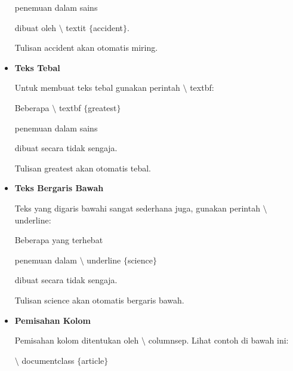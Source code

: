 \begin{itemize}
\hspace*{0.5in}penemuan dalam sains\par

\hspace*{0.5in}dibuat oleh $\setminus$ textit $ \{ $accident$ \} $.\par
\vspace{\baselineskip}
Tulisan accident akan otomatis miring.\par
\vspace{\baselineskip}
\vspace{10pt}
	\item {\fontsize{14pt}{14pt}\selectfont \textbf{Teks Tebal}}\par
Untuk membuat teks tebal gunakan perintah $\setminus$ textbf:\par
\hspace*{0.5in}Beberapa $\setminus$ textbf $ \{ $greatest$ \} $\par

\hspace*{0.5in}penemuan dalam sains\par

\hspace*{0.5in}dibuat secara tidak sengaja.\par
Tulisan greatest akan otomatis tebal.\par

\vspace{10pt}
	\item {\fontsize{14pt}{14pt}\selectfont \textbf{Teks Bergaris Bawah}}\par
\vspace{\baselineskip}
Teks yang digaris bawahi sangat sederhana juga, gunakan perintah $\setminus$ underline:\par
\vspace{\baselineskip}
\hspace*{0.5in}Beberapa yang terhebat\par

\hspace*{0.5in}penemuan dalam $\setminus$ underline $ \{ $science$ \} $\par

\hspace*{0.5in}dibuat secara tidak sengaja.\par
\vspace{\baselineskip}
Tulisan science akan otomatis bergaris bawah.\par
\vspace{\baselineskip}
\vspace{10pt}
	\item {\fontsize{14pt}{14pt}\selectfont \textbf{Pemisahan Kolom}}\par
\vspace{\baselineskip}
Pemisahan kolom ditentukan oleh $\setminus$ columnsep. Lihat contoh di bawah ini:\par
\vspace{\baselineskip}
\hspace*{0.5in}$\setminus$ documentclass $ \{ $article$ \} $\par


\end{itemize}
